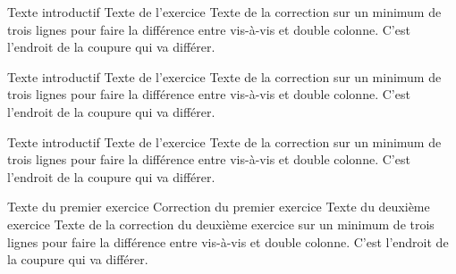 \documentclass[nocrop]{sesamanuel}
\begin{document}
\begin{methode}
  Texte introductif
  \exercice
  Texte de l’exercice
  \correction
  Texte de la correction sur un minimum de trois lignes pour faire la
  différence entre vis-à-vis et double colonne. C’est l’endroit de la
  coupure qui va différer.
\end{methode}

\begin{methode*1}
  Texte introductif
  \exercice
  Texte de l’exercice
  \correction
  Texte de la correction sur un minimum de trois lignes pour faire la
  différence entre vis-à-vis et double colonne. C’est l’endroit de la
  coupure qui va différer.
\end{methode*1}

\begin{methode*2}
  Texte introductif
  \exercice
  Texte de l’exercice
  \correction
  Texte de la correction sur un minimum de trois lignes pour faire la
  différence entre vis-à-vis et double colonne. C’est l’endroit de la
  coupure qui va différer.
\end{methode*2}

\begin{methode*2*2}
  \exercice
  \label{methode-exemple2}
  Texte du premier exercice
  \correction
  Correction du premier exercice
  \exercice
  Texte du deuxième exercice
  \correction
  Texte de la correction du deuxième exercice sur un minimum de trois
  lignes pour faire la différence entre vis-à-vis et double
  colonne. C’est l’endroit de la coupure qui va différer.
\end{methode*2*2}
\end{document}

